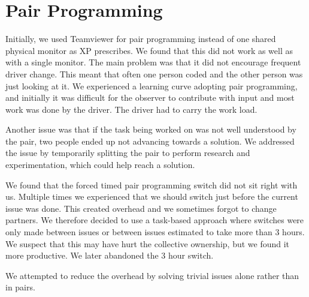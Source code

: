 \section{Pair Programming}
Initially, we used Teamviewer for pair programming instead of one shared physical monitor as XP prescribes. We found that this did not work as well as with a single monitor. The main problem was that it did not encourage frequent driver change. This meant that often one person coded and the other person was just looking at it. We experienced a learning curve adopting pair programming, and initially it was difficult for the observer to contribute with input and most work was done by the driver. The driver had to carry the work load.

Another issue was that if the task being worked on was not well understood by the pair, two people ended up not advancing towards a solution. We addressed the issue by temporarily splitting the pair to perform research and experimentation, which could help reach a solution.

We found that the forced timed pair programming switch did not sit right with us. Multiple times we experienced that we should switch just before the current issue was done. This created overhead and we sometimes forgot to change partners.
We therefore decided to use a task-based approach where switches were only made between issues or between issues estimated to take more than 3 hours. We suspect that this may have hurt the collective ownership, but we found it more productive. We later abandoned the 3 hour switch.

We attempted to reduce the overhead by solving trivial issues alone rather than in pairs. 